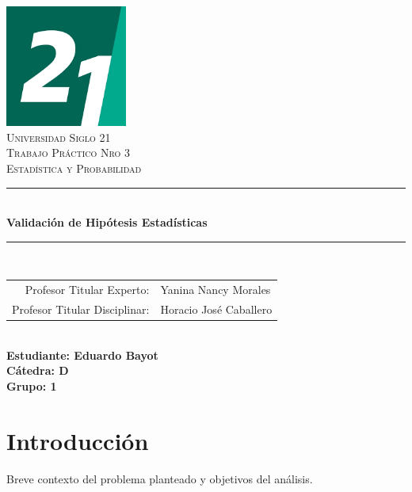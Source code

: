 \documentclass[a4paper,12pt]{article}
\begin{document}
\begin{titlepage}
    \begin{center}
        \includegraphics[width=0.3\textwidth]{logo.png}\\[1cm] %
        \textsc{\LARGE Universidad Siglo 21}\\[1.5cm]
        \textsc{\Large Trabajo Práctico Nro 3}\\[0.5cm]
        \textsc{\large Estadística y Probabilidad}\\[2cm]

        \rule{\linewidth}{0.5mm} \\[0.4cm]
        {\huge \bfseries Validación de Hipótesis Estadísticas}\\[0.4cm]
        \rule{\linewidth}{0.5mm} \\[1.5cm]

        \begin{tabular}{rl}
            \small Profesor Titular Experto: & \small Yanina Nancy Morales \\
            \small Profesor Titular Disciplinar: & \small Horacio José Caballero \\
        \end{tabular}
        \\[1.5cm]

        \textbf{\small Estudiante: Eduardo Bayot}\\
        \textbf{\small Cátedra: D}\\
        \textbf{\small Grupo: 1}
    \end{center}
\end{titlepage}



\date{}
\author{}

\tableofcontents




\tableofcontents

\section{Introducción}
Breve contexto del problema planteado y objetivos del análisis.
\end{document}

